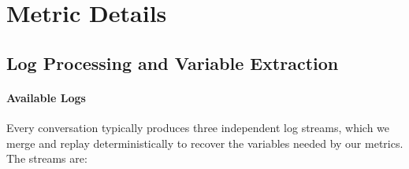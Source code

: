 
\clearpage
\section{Metric Details}
\label{app:metric-details}


\subsection{Log Processing and Variable Extraction}
\label{app:log-processing}                                                                          
\paragraph{Available Logs}
Every conversation typically produces three independent log streams, which we merge and replay deterministically to recover the variables needed by our metrics. The streams are:
